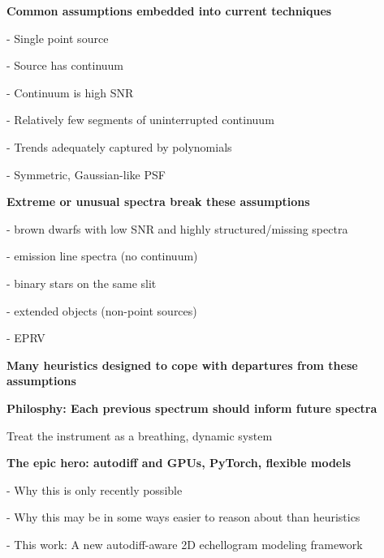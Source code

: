 \documentclass[twocolumn]{aastex63}
\begin{document}
\begin{mdframed}
  \textbf{Common assumptions embedded into current techniques} \par
  - Single point source\par
  - Source has continuum\par
  - Continuum is high SNR\par
  - Relatively few segments of uninterrupted continuum\par
  - Trends adequately captured by polynomials\par
  - Symmetric, Gaussian-like PSF\par
\end{mdframed}

\begin{mdframed}
  \textbf{Extreme or unusual spectra break these assumptions} \par
  - brown dwarfs with low SNR and highly structured/missing spectra\par
  - emission line spectra (no continuum)\par
  - binary stars on the same slit\par
  - extended objects (non-point sources)\par
  - EPRV\par
\end{mdframed}

\begin{mdframed}
  \textbf{Many heuristics designed to cope with departures from these assumptions} \par
  \textcolor{lightgray}{\lipsum[4]}
\end{mdframed}

\begin{mdframed}
  \textbf{Philosphy: Each previous spectrum should inform future spectra} \par
  Treat the instrument as a breathing, dynamic system\par
  \textcolor{lightgray}{\lipsum[5]}
\end{mdframed}

\begin{mdframed}
  \textbf{The epic hero: autodiff and GPUs, PyTorch, flexible models} \par
  - Why this is only recently possible\par
  - Why this may be in some ways easier to reason about than heuristics\par
  - This work: A new autodiff-aware 2D echellogram modeling framework\par
  \textcolor{lightgray}{\lipsum[6]}
\end{mdframed}
\end{document}
